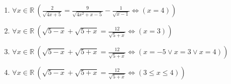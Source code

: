 \documentclass[11pt,a4paper]{article}
\begin{document}
\begin{enumerate}
\item $\displaystyle \forall x \in \mathbb{R}\ \left( \frac{2}{\sqrt{4x + 5}} = \frac{9}{\sqrt{4x^{2} + x - 5}} - \frac{1}{\sqrt{x - 1}} \iff \left( x = 4 \right) \right)$
\item $\displaystyle \forall x \in \mathbb{R}\ \left( \sqrt{5 - x} + \sqrt{5 + x} = \frac{12}{\sqrt{5 + x}} \iff \left( x = 3 \right) \right)$
\item $\displaystyle \forall x \in \mathbb{R}\ \left( \sqrt{5 - x} + \sqrt{5 + x} = \frac{12}{\sqrt{5 + x}} \iff \left( x = -5 \lor x = 3 \lor x = 4 \right) \right)$
\item $\displaystyle \forall x \in \mathbb{R}\ \left( \sqrt{5 - x} + \sqrt{5 + x} = \frac{12}{\sqrt{5 + x}} \iff \left( 3 \le x \le 4 \right) \right)$
\end{enumerate}
\end{document}

